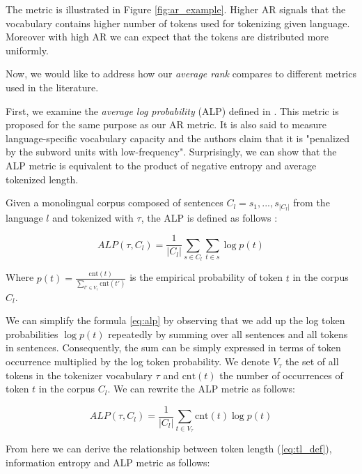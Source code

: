 The metric is illustrated in Figure \ref{fig:ar_example}. Higher AR signals that the vocabulary contains higher number of tokens used for tokenizing given language. Moreover with high AR we can expect that the tokens are distributed more uniformly.

Now, we would like to address how our \textit{average rank} compares to different metrics used in the literature. 

First, we examine the \textit{average log probability} (ALP) defined in \citet{zheng_allocating_2021}. This metric is proposed for the same purpose as our AR metric. It is also said to measure language-specific vocabulary capacity and the authors claim that it is "penalized by the subword units with low-frequency". Surprisingly, we can show that the ALP metric is equivalent to the product of negative entropy and average tokenized length.

Given a monolingual corpus composed of sentences $C_l = {s_1, ..., s_{|C_l|}}$ from the language $l$ and tokenized with $\tau$, the ALP is defined as follows \cite{zheng_allocating_2021}:

\begin{equation}
\label{eq:alp}
    ALP(\tau, C_l) = \frac{1}{|C_l|} \sum_{s \in C_l} \sum_{t \in s} \log p(t)
\end{equation}

Where $p(t) = \frac{\mathrm{cnt}(t)}{\sum_{t' \in V_\tau} \mathrm{cnt}(t')}$ is the empirical probability of token $t$ in the corpus $C_l$. 


We can simplify the formula \autoref{eq:alp} by observing that we add up the log token probabilities $\log p(t)$ repeatedly by summing over all sentences and all tokens in sentences. Consequently, the sum can be simply expressed in terms of token occurrence multiplied by the log token probability. We denote $V_\tau$ the set of all tokens in the tokenizer vocabulary $\tau$ and $\mathrm{cnt}(t)$ the number of occurrences of token $t$ in the corpus $C_l$. We can rewrite the ALP metric as follows:

\begin{equation}
    ALP(\tau, C_l) = \frac{1}{|C_l|} \sum_{t \in V_\tau} \mathrm{cnt}(t) \log p(t)
\end{equation}

From here we can derive the relationship between token length (\autoref{eq:tl_def}), information entropy and ALP metric as follows:

